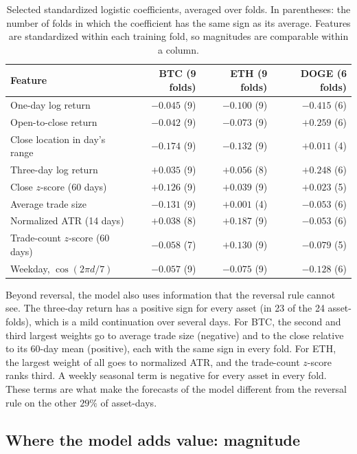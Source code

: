 \documentclass[preprint,12pt,authoryear,a4paper]{elsarticle}
\begin{document}
\begin{table}[htbp]\centering\small
\caption{Selected standardized logistic coefficients, averaged over folds. In
parentheses: the number of folds in which the coefficient has the same sign as its
average. Features are standardized within each training fold, so magnitudes are
comparable within a column.}
\label{tab:coef}
\begin{tabular}{@{}lrrr@{}}
\toprule
Feature & BTC (9 folds) & ETH (9 folds) & DOGE (6 folds) \\
\midrule
One-day log return               & $-0.045$ (9) & $-0.100$ (9) & $-0.415$ (6) \\
Open-to-close return             & $-0.042$ (9) & $-0.073$ (9) & $+0.259$ (6) \\
Close location in day's range    & $-0.174$ (9) & $-0.132$ (9) & $+0.011$ (4) \\
Three-day log return             & $+0.035$ (9) & $+0.056$ (8) & $+0.248$ (6) \\
Close $z$-score (60 days)        & $+0.126$ (9) & $+0.039$ (9) & $+0.023$ (5) \\
Average trade size               & $-0.131$ (9) & $+0.001$ (4) & $-0.053$ (6) \\
Normalized ATR (14 days)         & $+0.038$ (8) & $+0.187$ (9) & $-0.053$ (6) \\
Trade-count $z$-score (60 days)  & $-0.058$ (7) & $+0.130$ (9) & $-0.079$ (5) \\
Weekday, $\cos(2\pi d/7)$        & $-0.057$ (9) & $-0.075$ (9) & $-0.128$ (6) \\
\bottomrule
\end{tabular}
\end{table}

Beyond reversal, the model also uses information that the reversal rule cannot
see. The three-day return has a positive sign for every asset (in 23 of the 24
asset-folds), which is a mild continuation over several days. For BTC, the second
and third largest weights go to average trade size (negative) and to the close
relative to its 60-day mean (positive), each with the same sign in every fold. For
ETH, the largest weight of all goes to normalized ATR, and the trade-count
$z$-score ranks third. A weekly seasonal term is negative for every asset in every
fold. These terms are what make the forecasts of the model different from the
reversal rule on the other $29\%$ of asset-days.

\subsection{Where the model adds value: magnitude}\label{ssec:magnitude}
\end{document}
